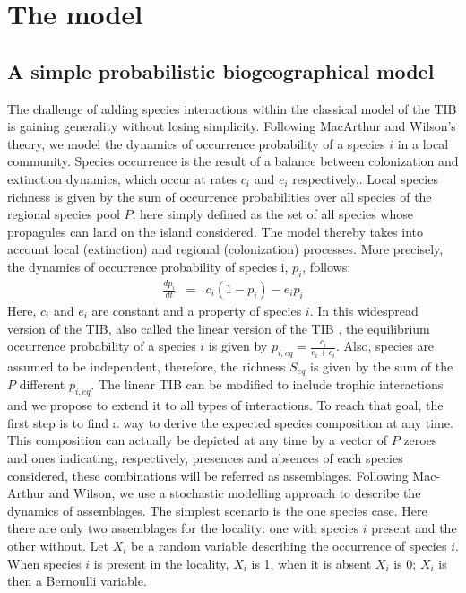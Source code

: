 \section{The model}

\subsection{A simple probabilistic biogeographical model}

The challenge of adding species interactions within the classical model of the TIB is gaining generality without losing simplicity. Following MacArthur and Wilson's theory, we model the dynamics of occurrence probability of a species $i$ in a local community. Species occurrence is the result of a balance between colonization and extinction dynamics, which occur at rates $c_i$ and $e_i$ respectively,. Local species richness is given by the sum of occurrence probabilities over all species of the regional species pool $P$, here simply defined as the set of all species whose propagules \citep[as defined in][]{Simberloff1969} can land on the island considered. The model thereby takes into account local (extinction) and regional (colonization) processes. More precisely, the dynamics of occurrence probability of species i, $p_i$, follows:
\begin{eqnarray}
\label{chap1eq1} \frac{dp_{i}}{dt}&=&c_i(1-p_{i})-e_ip_{i}
\end{eqnarray}
Here, $c_i$ and $e_i$ are constant and a property of species $i$. In this widespread version of the TIB, also called the linear version of the TIB \citep{Schoener2010}, the equilibrium occurrence probability of a species $i$ is given by $p_{i,eq}=\frac{c_i}{e_i+c_i}$. Also, species are assumed to be independent, therefore, the richness $S_{eq}$ is given by the sum of the $P$ different $p_{i,eq}$. The linear TIB can be modified to include trophic interactions \citep[after][]{Gravel2011} and we propose to extend it to all types of interactions. To reach that goal, the first step is to find a way to derive the expected species composition at any time. This composition can actually be depicted at any time by a vector of $P$ zeroes and ones indicating, respectively, presences and absences of each species considered, these combinations will be referred as assemblages. Following Mac-Arthur and Wilson, we use a stochastic modelling approach to describe the dynamics of assemblages. The simplest scenario is the one species case. Here there are only two assemblages for the locality: one with species $i$ present and the other without. Let $X_{i}$ be a random variable describing the occurrence of species $i$. When species $i$ is present in the locality, $X_i$ is 1, when it is absent $X_i$ is 0; $X_i$ is then a Bernoulli variable.
